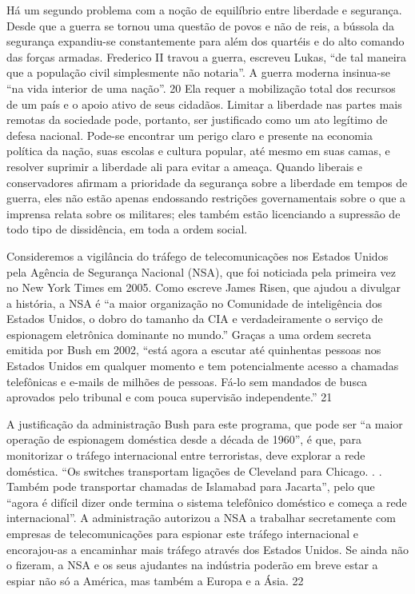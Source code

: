 \par
 
Há um segundo problema com a noção de equilíbrio entre liberdade e segurança. Desde que a guerra se tornou uma questão de povos e não de reis, a bússola da segurança expandiu-se constantemente para além dos quartéis e do alto comando das forças armadas. Frederico II travou a guerra, escreveu Lukas, “de tal maneira que a população civil simplesmente não notaria”. A guerra moderna insinua-se “na vida interior de uma nação”.
 {\color{blue} 20}  
Ela requer a mobilização total dos recursos de um país e o apoio ativo de seus cidadãos. Limitar a liberdade nas partes mais remotas da sociedade pode, portanto, ser justificado como um ato legítimo de defesa nacional. Pode-se encontrar um perigo claro e presente na economia política da nação, suas escolas e cultura popular, até mesmo em suas camas, e resolver suprimir a liberdade ali para evitar a ameaça. Quando liberais e conservadores afirmam a prioridade da segurança sobre a liberdade em tempos de guerra, eles não estão apenas endossando restrições governamentais sobre o que a imprensa relata sobre os militares; eles também estão licenciando a supressão de todo tipo de dissidência, em toda a ordem social.
 
\par
 
Consideremos a vigilância do tráfego de telecomunicações nos Estados Unidos pela Agência de Segurança Nacional (NSA), que foi noticiada pela primeira vez no New York Times em 2005. Como escreve James Risen, que ajudou a divulgar a história, a NSA é “a maior organização no Comunidade de inteligência dos Estados Unidos, o dobro do tamanho da CIA e verdadeiramente o serviço de espionagem eletrônica dominante no mundo.” Graças a uma ordem secreta emitida por Bush em 2002, “está agora a escutar até quinhentas pessoas nos Estados Unidos em qualquer momento e tem potencialmente acesso a chamadas telefônicas e e-mails de milhões de pessoas. Fá-lo sem mandados de busca aprovados pelo tribunal e com pouca supervisão independente.”
 {\color{blue} 21}  

 
\par
 
A justificação da administração Bush para este programa, que pode ser “a maior operação de espionagem doméstica desde a década de 1960”, é que, para monitorizar o tráfego internacional entre terroristas, deve explorar a rede doméstica. “Os switches transportam ligações de Cleveland para Chicago. . . Também pode transportar chamadas de Islamabad para Jacarta”, pelo que “agora é difícil dizer onde termina o sistema telefônico doméstico e começa a rede internacional”. A administração autorizou a NSA a trabalhar secretamente com empresas de telecomunicações para espionar este tráfego internacional e encorajou-as a encaminhar mais tráfego através dos Estados Unidos. Se ainda não o fizeram, a NSA e os seus ajudantes na indústria poderão em breve estar a espiar não só a América, mas também a Europa e a Ásia.
 {\color{blue} 22}  

